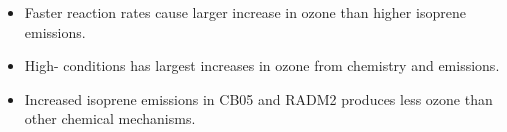 \begin{GreyBox}
\begin{block}{}
\begin{columns}[t]
                \begin{flushright}
                    \begin{WhiteBox} \vspace{8mm}
                        \begin{itemize}
                            \item Faster reaction rates cause larger increase in ozone than higher isoprene emissions. \vspace{13mm}
                            \item High- conditions has largest increases in ozone from chemistry and emissions. \vspace{13mm}
                            \item Increased isoprene emissions in CB05 and RADM2 produces less ozone than other chemical mechanisms. %
                        \end{itemize}
                    \end{WhiteBox}
                \end{flushright}
        \end{columns}
    \end{block}
\end{GreyBox}
